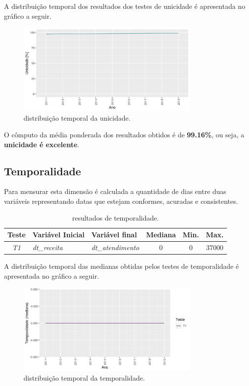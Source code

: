 \documentclass[
  12,
]{proadi}
\begin{document}
A distribuição temporal dos resultados dos testes de unicidade é
apresentada no gráfico a seguir.

\begin{figure}
\centering
\includegraphics[width=0.8\textwidth,height=\textheight]{imagens/unic-anual.png}
\caption{distribuição temporal da unicidade.}
\end{figure}

O cômputo da média ponderada dos resultados obtidos é de
\textbf{99.16\%}, ou seja, a \textbf{unicidade é excelente}.

\hypertarget{temporalidade}{%
\subsection{Temporalidade}\label{temporalidade}}

Para mensurar esta dimensão é calculada a quantidade de dias entre duas
variáveis representando datas que estejam conformes, acuradas e
consistentes.

\begin{table}[H]

\caption{\label{tab:unnamed-chunk-18}resultados de temporalidade.}
\centering
\fontsize{10}{12}\selectfont
\begin{tabular}[t]{>{}c>{}l>{}lccc}
\toprule
Teste & Variável Inicial & Variável final & Mediana & Min. & Max.\\
\midrule
\em{T1} & \em{dt\_receita} & \em{dt\_atendimento} & 0 & 0 & 37000\\
\bottomrule
\end{tabular}
\end{table}

A distribuição temporal das medianas obtidas pelos testes de
temporalidade é apresentada no gráfico a seguir.

\begin{figure}
\centering
\includegraphics[width=0.8\textwidth,height=\textheight]{imagens/temp-anual.png}
\caption{distribuição temporal da temporalidade.}
\end{figure}
\end{document}
